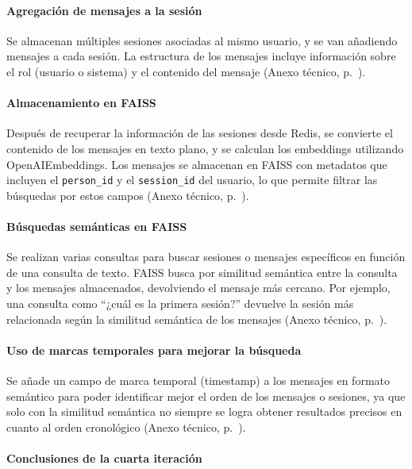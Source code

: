\paragraph{Agregación de mensajes a la sesión}

Se almacenan múltiples sesiones asociadas al mismo usuario, y se van añadiendo mensajes a cada sesión. La estructura de los mensajes incluye información sobre el rol (usuario o sistema) y el contenido del mensaje (Anexo técnico, p.~\pageref{anexo:code-4-1-4-4}).

\paragraph{Almacenamiento en FAISS}

Después de recuperar la información de las sesiones desde Redis, se convierte el contenido de los mensajes en texto plano, y se calculan los embeddings utilizando OpenAIEmbeddings. Los mensajes se almacenan en FAISS con metadatos que incluyen el \texttt{person\_id} y el \texttt{session\_id} del usuario, lo que permite filtrar las búsquedas por estos campos (Anexo técnico, p.~\pageref{anexo:code-4-1-4-5}).

\paragraph{Búsquedas semánticas en FAISS}

Se realizan varias consultas para buscar sesiones o mensajes específicos en función de una consulta de texto. FAISS busca por similitud semántica entre la consulta y los mensajes almacenados, devolviendo el mensaje más cercano. Por ejemplo, una consulta como ``¿cuál es la primera sesión?'' devuelve la sesión más relacionada según la similitud semántica de los mensajes (Anexo técnico, p.~\pageref{anexo:code-4-1-4-6}).

\paragraph{Uso de marcas temporales para mejorar la búsqueda}

Se añade un campo de marca temporal (timestamp) a los mensajes en formato semántico para poder identificar mejor el orden de los mensajes o sesiones, ya que solo con la similitud semántica no siempre se logra obtener resultados precisos en cuanto al orden cronológico (Anexo técnico, p.~\pageref{anexo:code-4-1-4-7}).

\paragraph{Conclusiones de la cuarta iteración}

